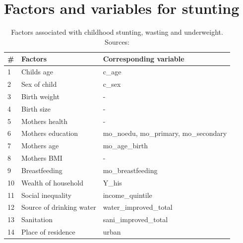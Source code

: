 \documentclass[a4paper, 11pt]{article} %
\begin{document}
\newpage
\section{Factors and variables for stunting} \label{sec:appendix_tab_stunting}
\begin{table}[h!]
\begin{tabular}{@{}lll@{}}
\toprule
\# & \textbf{Factors} & \textbf{Corresponding variable} \\ \midrule
1 & Childs age & c\_age \\
2 & Sex of child & c\_sex  \\
3 & Birth weight & -  \\
4 & Birth size & - \\ \midrule

5 & Mothers health & - \\
6 & Mothers education & mo\_noedu, mo\_primary, mo\_secondary \\
7 & Mothers age  & mo\_age\_birth \\
8 & Mothers BMI & - \\
9 & Breastfeeding & mo\_breastfeeding \\ \midrule

10 & Wealth of household & Y\_his  \\
11 & Social inequality & income\_quintile \\
12 & Source of drinking water & water\_improved\_total  \\
13 & Sanitation &  sani\_improved\_total  \\
14 & Place of residence & urban  \\ \bottomrule
\end{tabular}
    \caption{Factors associated with childhood stunting, wasting and underweight. Sources: \cite{Akombi2017Aug} \cite{UNI18}}
    \label{table:stunting}
\end{table}

\newpage
\end{document}

